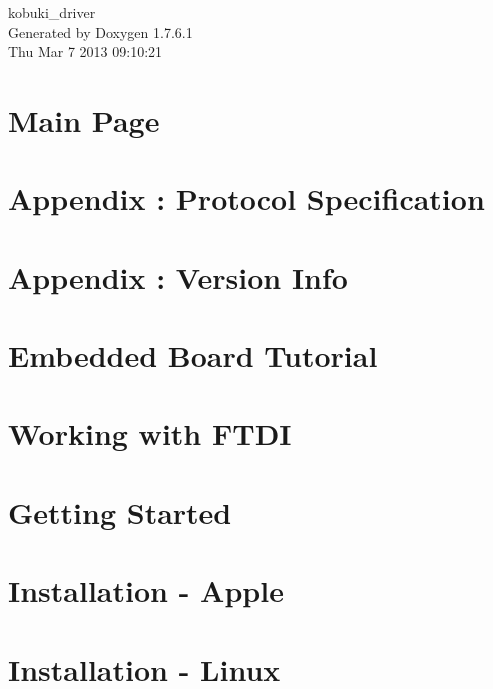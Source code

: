 \documentclass[a4paper]{book}
\begin{document}
\begin{titlepage}
\vspace*{7cm}
\begin{center}
{\Large kobuki\-\_\-driver }\\
\vspace*{1cm}
{\large \-Generated by Doxygen 1.7.6.1}\\
\vspace*{0.5cm}
{\small Thu Mar 7 2013 09:10:21}\\
\end{center}
\end{titlepage}
\clearemptydoublepage
{}
\tableofcontents
\clearemptydoublepage
{}
\chapter{\-Main \-Page}
\label{index}
\chapter{\-Appendix \-: \-Protocol \-Specification}
\label{enAppendixProtocolSpecification}

\chapter{\-Appendix \-: \-Version \-Info}
\label{enAppendixVersionInfo}

\chapter{\-Embedded \-Board \-Tutorial}
\label{enEmbeddedBoardTutorial}

\chapter{\-Working with \-F\-T\-D\-I}
\label{enFtdiGuide}

\chapter{\-Getting \-Started}
\label{enGettingStartedGuide}

\chapter{\-Installation -\/ \-Apple}
\label{koInstallationAppleGuide}

\chapter{\-Installation -\/ \-Linux}
\label{enInstallationLinuxGuide}

\end{document}
